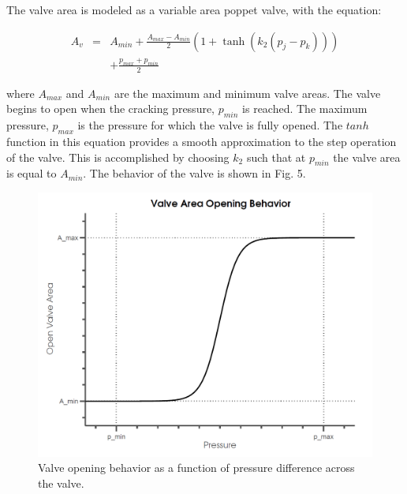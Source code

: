 \documentclass[twocolumn,10pt]{asme2e}
\begin{document}
The valve area is modeled as a variable area poppet valve, with the equation:  

\begin{eqnarray}
A_v &=& A_{min}+\frac{A_{max}-A_{min}}{2}(1+\tanh(k_2(p_j-p_k)))\nonumber\\
&& +\frac{p_{max}+p_{min}}{2}
\end{eqnarray}

\noindent where $A_{max}$ and $A_{min}$ are the maximum and minimum valve areas. The valve begins to open when the cracking pressure, $p_{min}$ is reached. The maximum pressure, $p_{max}$ is the pressure for which the valve is fully opened.  The $tanh$ function in this equation provides a smooth approximation to the step operation of the 
valve. This is accomplished by choosing $k_2$ such that at $p_{min}$ the valve area is equal to $A_{min}$. The behavior of the valve is shown in Fig. 5. 

\begin{figure}[t]
    \centering
    \includegraphics[width=1\columnwidth]{Images/ValveBehavior}
    \caption{Valve opening behavior as a function of pressure difference across the valve.}
    \end{figure}    
\end{document}

